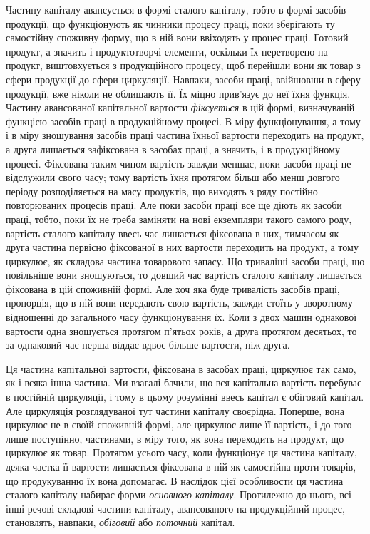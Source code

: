 Частину капіталу авансується в формі сталого капіталу, тобто в формі
засобів продукції, що функціонують як чинники процесу праці, поки
зберігають ту самостійну споживну форму, що в ній вони ввіходять
у процес праці. Готовий продукт, а значить і продуктотворчі елементи,
оскільки їх перетворено на продукт, виштовхується з продукційного
процесу, щоб перейшли вони як товар з сфери продукції до сфери циркуляції.
Навпаки, засоби праці, ввійшовши в сферу продукції, вже ніколи
не облишають її. Їх міцно прив’язує до неї їхня функція. Частину
авансованої капітальної вартости \emph{фіксується} в цій формі, визначуваній
функцією засобів праці в продукційному процесі. В міру функціонування,
а тому і в міру зношування засобів праці частина їхньої вартости
переходить на продукт, а друга лишається зафіксована в засобах
праці, а значить, і в продукційному процесі. Фіксована таким чином
вартість завжди меншає, поки засоби праці не відслужили свого часу;
тому вартість їхня протягом більш або менш довгого періоду розподіляється
на масу продуктів, що виходять з ряду постійно повторюваних
процесів праці. Але поки засоби праці все ще діють як засоби праці,
тобто, поки їх не треба заміняти на нові екземпляри такого самого роду,
вартість сталого капіталу ввесь час лишається фіксована в них, тимчасом
як друга частина первісно фіксованої в них вартости переходить на
продукт, а тому циркулює, як складова частина товарового запасу. Що
триваліші засоби праці, що повільніше вони зношуються, то довший час
вартість сталого капіталу лишається фіксована в цій споживній формі.
Але хоч яка буде тривалість засобів праці, пропорція, що в ній вони
передають свою вартість, завжди стоїть у зворотному відношенні до
загального часу функціонування їх. Коли з двох машин однакової
вартости одна зношується протягом п’ятьох років, а друга протягом десятьох,
то за однаковий час перша віддає вдвоє більше вартости, ніж
друга.

Ця частина капітальної вартости, фіксована в засобах праці, циркулює
так само, як і всяка інша частина. Ми взагалі бачили, що вся капітальна
вартість перебуває в постійній циркуляції, і тому в цьому розумінні
ввесь капітал є обіговий капітал. Але циркуляція розглядуваної
тут частини капіталу своєрідна. Поперше, вона циркулює не в своїй
споживній формі, але циркулює лише її вартість, і до того лише поступінно,
частинами, в міру того, як вона переходить на продукт, що циркулює
як товар. Протягом усього часу, коли функціонує ця частина капіталу,
деяка частка її вартости лишається фіксована в ній як самостійна
проти товарів, що продукуванню їх вона допомагає. В наслідок цієї
особливости ця частина сталого капіталу набирає форми \emph{основного
капіталу}. Протилежно до нього, всі інші речові складові частини капіталу,
авансованого на продукційний процес, становлять, навпаки, \emph{обіговий}
або \emph{поточний} капітал.

